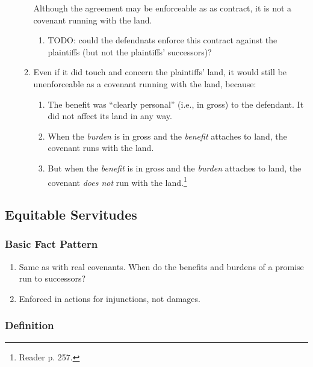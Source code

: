 \begin{enumerate}
\begin{enumerate}
        Although the agreement may be enforceable as as contract, it is not a 
        covenant running with the land.
        \begin{enumerate}
            \item  TODO: could the defendnats enforce this contract against 
            the plaintiffs (but not the plaintiffs' successors)?
        \end{enumerate}
        \item Even if it did touch and concern the plaintiffs' land, it would 
        still be unenforceable as a covenant running with the land, because:
        \begin{enumerate}
            \item The benefit was ``clearly personal'' (i.e., in gross) to the 
            defendant. It did not affect its land in any way.
            \item When the \emph{burden} is in gross and the \emph{benefit} 
            attaches to land, the covenant runs with the land.
            \item But when the \emph{benefit} is in gross and the 
            \emph{burden} attaches to land, the covenant \emph{does not} run 
            with the land.\footnote{Reader p. 257.}
        \end{enumerate}
    \end{enumerate}
\end{enumerate}

\subsection{Equitable Servitudes}

\subsubsection{Basic Fact Pattern}

\begin{enumerate}
    \item Same as with real covenants. When do the benefits and burdens of a 
    promise run to successors?
    \item Enforced in actions for injunctions, not damages.
\end{enumerate}

\subsubsection{Definition}

